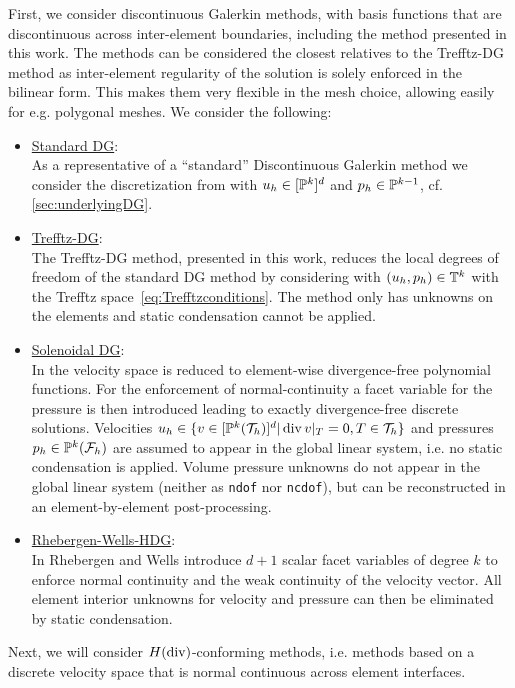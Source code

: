 \documentclass[pdflatex,sn-mathphys,Numbered]{sn-jnl}%
\theoremstyle{remark}%
\theoremstyle{definition}%
\begin{document}
First, we consider discontinuous Galerkin methods, with basis functions that are discontinuous across inter-element boundaries, including the method presented in this work.  
The methods can be considered the closest relatives to the Trefftz-DG method as inter-element regularity of the solution is solely enforced in the bilinear form. 
This makes them very flexible in the mesh choice, allowing easily for e.g. polygonal meshes.
We consider the following:
%
\begin{itemize}
  \item \underline{Standard DG}: \\[0.4ex] As a representative of a ``standard'' Discontinuous Galerkin method we consider the discretization from \cite[Section 6.1.5]{di2011mathematical} with $u_h \in [\mathbb{P}^k]^d$ and $p_h \in \mathbb{P}^{k-1}$, cf. \cref{sec:underlyingDG}.
  \item \underline{Trefftz-DG}: \\ The Trefftz-DG method, presented in this work, reduces the local degrees of freedom of the standard DG method by considering with $(u_h,p_h) \in \mathbb{T}^k$ with the Trefftz space~\eqref{eq:Trefftzconditions}. The method only has unknowns on the elements and static condensation cannot be applied.
  \item \underline{Solenoidal DG}: \\[0.4ex] In \cite{montlaur08,montlaur2010discontinuous} the velocity space is reduced to element-wise divergence-free polynomial functions. For the enforcement of normal-continuity a facet variable for the pressure is then introduced leading to exactly divergence-free discrete solutions. Velocities $u_h \in \{ v \in [\mathbb{P}^k({\mathcal{T}_h})]^d | \operatorname{\mathrm{div}} v|_T = 0, T \in {\mathcal{T}_h} \} $ and pressures $p_h \in \mathbb{P}^k({\mathcal{F}_h})$ are assumed to appear in the global linear system, i.e. no static condensation is applied. Volume pressure unknowns do not appear in the global linear system (neither as \texttt{ndof} nor \texttt{ncdof}), but can be reconstructed in an element-by-element post-processing.
  \item \underline{Rhebergen-Wells-HDG}: \\[0.4ex] In \cite{RhebergenWells} Rhebergen and Wells introduce $d+1$ scalar facet variables of degree $k$ to enforce normal continuity and the weak continuity of the velocity vector. All element interior unknowns for velocity and pressure can then be eliminated by static condensation.
\end{itemize}
%
Next, we will consider $H(\operatorname{\mathrm{div}})$-conforming methods, i.e. methods based on a discrete velocity space that is normal continuous across element interfaces.
\end{document}
